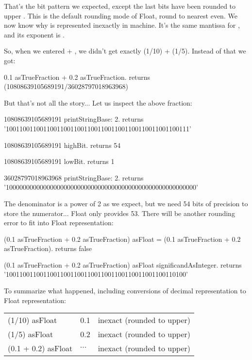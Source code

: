 \documentclass[a4paper,10pt,twoside]{book}
\begin{document}
That's the bit pattern we expected, except the last bits  have been rounded to upper . This is the default rounding mode of Float, round to nearest even. We now know why  is represented inexactly in machine. It's the same mantissa for , and its exponent is .

So, when we entered  + , we didn't get exactly (1/10) + (1/5).
Instead of that we got:

 \begin{code}{}
0.1 asTrueFraction + 0.2 asTrueFraction.
	returns  (10808639105689191/36028797018963968)
\end{code}

But that's not all the story... Let us inspect the above fraction: 
 \begin{code}{}
10808639105689191 printStringBase: 2.
	returns  '100110011001100110011001100110011001100110011001100111'
	
10808639105689191 highBit.
	returns  54
	
10808639105689191 lowBit.
	returns  1

36028797018963968 printStringBase: 2.
	returns  '10000000000000000000000000000000000000000000000000000000'
\end{code}

The denominator is a power of 2 as we expect, but we need 54 bits of precision to store the numerator... Float only provides 53. There will be another rounding error to fit into Float representation:

\begin{code}{}
(0.1 asTrueFraction + 0.2 asTrueFraction) asFloat = (0.1 asTrueFraction + 0.2 asTrueFraction).
	returns false
	
(0.1 asTrueFraction + 0.2 asTrueFraction) asFloat significandAsInteger.
	returns '10011001100110011001100110011001100110011001100110100'
\end{code}

To summarize what happened, including conversions of decimal representation to Float representation:\\
\begin{tabular}{lll}
(1/10) asFloat & 0.1 & inexact (rounded to upper) \\
(1/5) asFloat & 0.2 & inexact (rounded to upper) \\
(0.1 + 0.2) asFloat & $\cdots$ & inexact (rounded to upper)  \\
\end{tabular}
\end{document}
